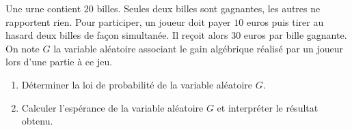 \documentclass[11pt]{article}
\begin{document}
\begin{exo}
  Une urne contient $20$ billes. Seules deux billes sont gagnantes, les autres
  ne rapportent rien. Pour participer, un joueur doit payer $10$ euros puis
  tirer au hasard deux billes de façon simultanée. Il reçoit alors $30$ euros
  par bille gagnante. On note $G$ la variable aléatoire associant le gain
  algébrique réalisé par un joueur lors d'une partie à ce jeu.
  \begin{enumerate}
    \item Déterminer la loi de probabilité de la variable aléatoire $G$.
    \item Calculer l'espérance de la variable aléatoire $G$ et interpréter le
      résultat obtenu.
  \end{enumerate}
\end{exo}
\end{document}
